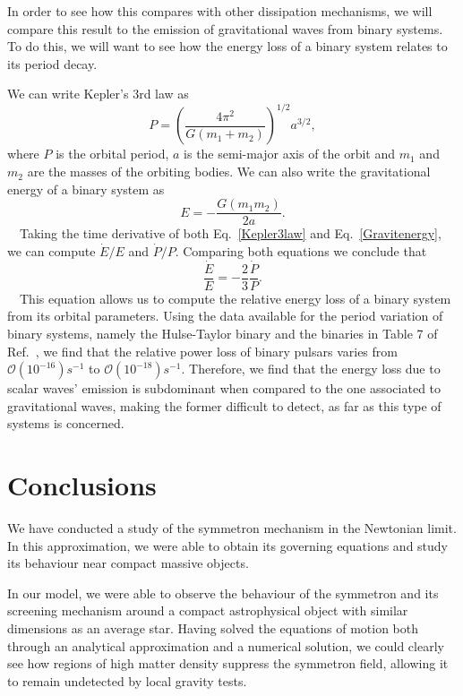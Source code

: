\documentclass[nofootinbib,twocolumn]{revtex4}
\begin{document}
In order to see how this compares with other dissipation mechanisms, we will compare this result to the emission of gravitational waves from binary systems. To do this, we will want to see how the energy loss of a binary system relates to its period decay.

We can write Kepler's 3rd law as
\begin{equation}
    P = \left(\frac{4\pi^2}{G\left(m_1+m_2\right)}\right)^{1/2}a^{3/2},
    \label{Kepler3law}
\end{equation}
where $P$ is the orbital period, $a$ is the semi-major axis of the orbit and $m_1$ and $m_2$ are the masses of the orbiting bodies. 
We can also write the gravitational energy of a binary system as 
\begin{equation}
     E = -\frac{G\left(m_1m_2\right)}{2a}.
     \label{Gravitenergy}
\end{equation}
~~Taking the time derivative of both Eq.~\eqref{Kepler3law} and Eq.~\eqref{Gravitenergy}, we can compute $\Dot{E}/E$ and $\Dot{P}/P$. Comparing both equations we conclude that
\begin{equation}
    \frac{\Dot{E}}{E} = -\frac{2}{3}\frac{\Dot{P}}{P}.
    \label{periodloss}
\end{equation}
~~This equation allows us to compute the relative energy loss of a binary system from its orbital parameters. Using the data available for the period variation of binary systems, namely the Hulse-Taylor binary and the binaries in Table 7 of Ref.~\cite{Will:2014kxa}, we find that the relative power loss of binary pulsars varies from $\mathcal{O}(10^{-16})s^{-1}$ to $\mathcal{O}(10^{-18})s^{-1}$. Therefore, we find that the energy loss due to scalar waves' emission is subdominant when compared to the one associated to gravitational waves, making the former difficult to detect, as far as this type of systems is concerned.

\section{\label{sec6}Conclusions}

We have conducted a study of the symmetron mechanism in the Newtonian limit. 
In this approximation, we were able to obtain its governing equations and study its behaviour near compact massive objects.

In our model, we were able to observe the behaviour of the symmetron and its screening mechanism around a compact astrophysical object with similar dimensions as an average star.
Having solved the equations of motion both through an analytical approximation and a numerical solution, we could clearly see how regions of high matter density suppress the symmetron field, allowing it to remain undetected by local gravity tests.
\end{document}
